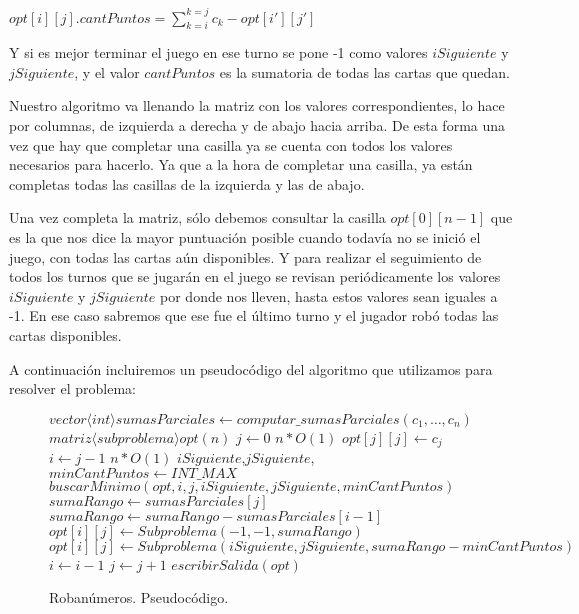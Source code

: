 $opt[i][j].cantPuntos = \sum_{k=i}^{k=j} c_k - opt[i'][j']$

Y si es mejor terminar el juego en ese turno se pone -1 como valores $iSiguiente$ y $jSiguiente$, y el valor $cantPuntos$ es la sumatoria de todas las cartas que quedan.

Nuestro algoritmo va llenando la matriz con los valores correspondientes, lo hace por columnas, de izquierda a derecha y de abajo hacia arriba. De esta forma una vez que hay que completar una casilla ya se cuenta con todos los valores necesarios para hacerlo. Ya que a la hora de completar una casilla, ya están completas todas las casillas de la izquierda y las de abajo. 

Una vez completa la matriz, sólo debemos consultar la casilla $opt[0][n-1]$ que es la que nos dice la mayor puntuación posible cuando todavía no se inició el juego, con todas las cartas aún disponibles. Y para realizar el seguimiento de todos los turnos que se jugarán en el juego se revisan periódicamente los valores $iSiguiente$ y $jSiguiente$ por donde nos lleven, hasta estos valores sean iguales a -1. En ese caso sabremos que ese fue el último turno y el jugador robó todas las cartas disponibles.

A continuación incluiremos un pseudocódigo del algoritmo que utilizamos para resolver el problema:

\begin{center}
\begin{figure}[H]
    \begin{pseudo}
            \State $vector\langle int \rangle sumasParciales \leftarrow computar\_sumasParciales(c_1, \ldots, c_n)$ 
            \State $matriz\langle subproblema \rangle opt(n)$ 
            \State $j \leftarrow 0$ 
             \hfill $n*O(1)$
                \State $opt[j][j] \leftarrow c_j$
                \State $i \leftarrow j-1$
                 \hfill $n*O(1)$
                    \State $iSiguiente$,$jSiguiente$, $minCantPuntos \leftarrow INT\_MAX$ 
		    \State $buscarMinimo(opt,i,j,iSiguiente,jSiguiente,minCantPuntos)$ 
		    \State $sumaRango \leftarrow sumasParciales[j]$ 
		     
			\State $sumaRango \leftarrow sumaRango - sumasParciales[i-1]$ 
		    \EndIf
		     
			\State $opt[i][j] \leftarrow Subproblema(-1,-1,sumaRango)$ 
		    \Else
			\State $opt[i][j] \leftarrow Subproblema(iSiguiente,jSiguiente, sumaRango - minCantPuntos)$ 
		    \EndIf
		    \State $i \leftarrow i-1$
		 \EndWhile
		 \State $j \leftarrow j+1$
            \EndWhile
            \State $escribirSalida(opt)$ 
        \EndProcedure
    \end{pseudo}
    \caption{Robanúmeros. Pseudocódigo.}
    \label{problema1-pseudo}
\end{figure}
\end{center}
